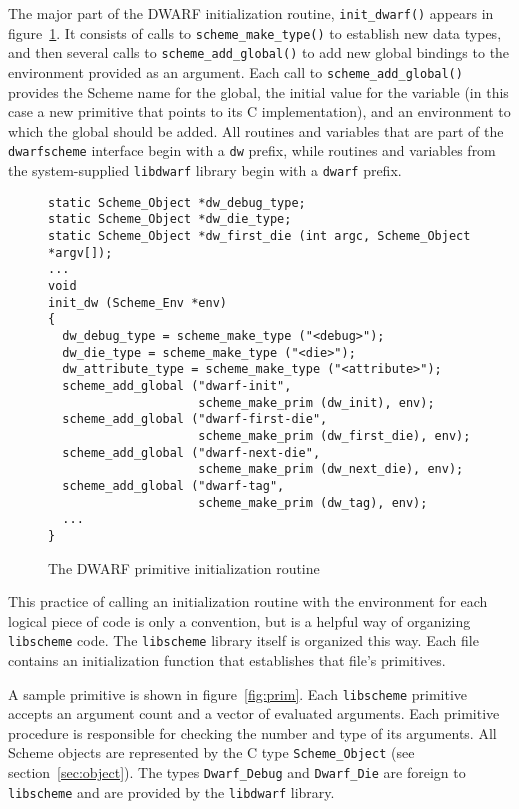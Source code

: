 The major part of the DWARF initialization routine,
\verb+init_dwarf()+ appears in figure~\ref{fig:init}.  It consists of
calls to \verb+scheme_make_type()+ to establish new data types, and
then several calls to \verb+scheme_add_global()+ to add new global
bindings to the environment provided as an argument.  Each call to
\verb+scheme_add_global()+ provides the Scheme name for the global,
the initial value for the variable (in this case a new primitive that
points to its C implementation), and an environment to which the
global should be added.  All routines and variables that are part of
the \verb+dwarfscheme+ interface begin with a \verb+dw+ prefix, while
routines and variables from the system-supplied \verb+libdwarf+
library begin with a \verb+dwarf+ prefix.

\begin{figure}[htbp]
\begin{center}
\begin{verbatim}
static Scheme_Object *dw_debug_type;
static Scheme_Object *dw_die_type;
static Scheme_Object *dw_first_die (int argc, Scheme_Object *argv[]);
...
void
init_dw (Scheme_Env *env)
{
  dw_debug_type = scheme_make_type ("<debug>");
  dw_die_type = scheme_make_type ("<die>");
  dw_attribute_type = scheme_make_type ("<attribute>");
  scheme_add_global ("dwarf-init", 
                     scheme_make_prim (dw_init), env);
  scheme_add_global ("dwarf-first-die", 
                     scheme_make_prim (dw_first_die), env);
  scheme_add_global ("dwarf-next-die", 
                     scheme_make_prim (dw_next_die), env);
  scheme_add_global ("dwarf-tag", 
                     scheme_make_prim (dw_tag), env);
  ...
}
\end{verbatim}
\end{center}  
  \caption{The DWARF primitive initialization routine}
  \label{fig:init}
\end{figure}

This practice of calling an initialization routine with the
environment for each logical piece of code is only a convention, but
is a helpful way of organizing \verb+libscheme+ code.  The
\verb+libscheme+ library itself is organized this way.  Each file
contains an initialization function that establishes that file's
primitives.

A sample primitive is shown in figure~\ref{fig:prim}.  Each
\verb+libscheme+ primitive accepts an argument count and a vector of
evaluated arguments.  Each primitive procedure is responsible for
checking the number and type of its arguments.  All Scheme objects are
represented by the C type \verb+Scheme_Object+ (see
section~\ref{sec:object}).  The types \verb+Dwarf_Debug+ and
\verb+Dwarf_Die+ are foreign to \verb+libscheme+ and are provided by
the \verb+libdwarf+ library.  

